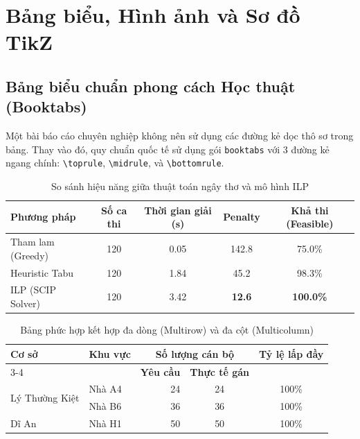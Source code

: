 \section{Bảng biểu, Hình ảnh và Sơ đồ TikZ}
\label{sec:tables_figures}

\subsection{Bảng biểu chuẩn phong cách Học thuật (Booktabs)}
Một bài báo cáo chuyên nghiệp không nên sử dụng các đường kẻ dọc thô sơ trong bảng. Thay vào đó, quy chuẩn quốc tế sử dụng gói \texttt{booktabs} với 3 đường kẻ ngang chính: \texttt{\textbackslash toprule}, \texttt{\textbackslash midrule}, và \texttt{\textbackslash bottomrule}.

\begin{table}[h!]
\centering
\caption{So sánh hiệu năng giữa thuật toán ngây thơ và mô hình ILP}
\label{tab:comparison}
\setlength{\tabcolsep}{4pt}
\begin{tabular}{lcccc}
\toprule
\textbf{Phương pháp} & \textbf{Số ca thi} & \textbf{Thời gian giải (s)} & \textbf{Penalty} & \textbf{Khả thi (Feasible)} \\
\midrule
Tham lam (Greedy)   & 120                & 0.05                        & 142.8            & 75.0\% \\
Heuristic Tabu      & 120                & 1.84                        & 45.2             & 98.3\% \\
ILP (SCIP Solver)   & 120                & 3.42                        & \textbf{12.6}    & \textbf{100.0\%} \\
\bottomrule
\end{tabular}
\end{table}

\begin{table}[h!]
\centering
\caption{Bảng phức hợp kết hợp đa dòng (Multirow) và đa cột (Multicolumn)}
\label{tab:complex}
\begin{tabular}{llrcc}
\toprule
\multirow{2}{*}{\textbf{Cơ sở}} & \multirow{2}{*}{\textbf{Khu vực}} & \multicolumn{2}{c}{\textbf{Số lượng cán bộ}} & \multirow{2}{*}{\textbf{Tỷ lệ lấp đầy}} \\
\cmidrule(lr){3-4}
& & \textbf{Yêu cầu} & \textbf{Thực tế gán} & \\
\midrule
\multirow{2}{*}{Lý Thường Kiệt} & Nhà A4 & 24 & 24 & 100\% \\
                                & Nhà B6 & 36 & 36 & 100\% \\
\midrule
Dĩ An                           & Nhà H1 & 50 & 50 & 100\% \\
\bottomrule
\end{tabular}
\end{table}

